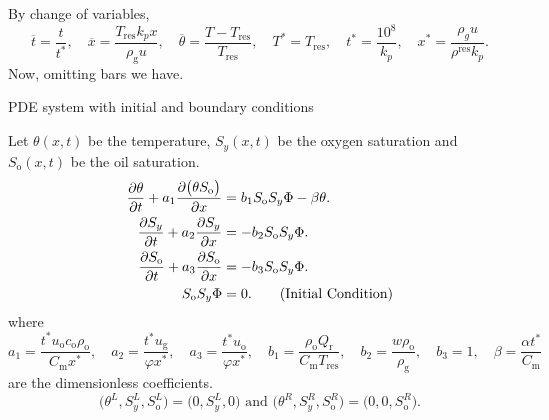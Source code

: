 \documentclass[
    8pt,
    aspectratio=1610,
    c,
    intlimits,
    leqno,
    professionalfonts,
]{beamer}
\begin{document}
\begin{frame}
	\frametitle{\secname}
	By change of variables,
	\begin{equation}
		\overline{t}=
		\frac{t}{t^{\ast}},\quad
		\overline{x}=
		\frac{T_{\text{res}}k_{p}x}{\rho_{\text{g}}u},\quad
		\overline{\theta}=
		\frac{T-T_{\text{res}}}{T_{\text{res}}},\quad
		T^{\ast}=T_{\text{res}},\quad
		t^{\ast}=
		\frac{10^{8}}{k_{p}},\quad
		x^{\ast}=
		\frac{\rho_{g}u}{\rho^{\text{res}}k_{p}}.
	\end{equation}
	Now, omitting bars we have.

	\begin{block}{PDE system with initial and boundary
			conditions~\cite{Quispe2020}}

		Let $\theta\left(x,t\right)$ be the \alert{temperature},
		$S_{y}\left(x,t\right)$ be the \alert{oxygen saturation} and
		$S_{\text{o}}\left(x,t\right)$ be the \alert{oil saturation}.
		\begin{align}
			\diffp{\theta}{t}+
			a_{1}
			\diffp{
				\big(
				\theta
				S_{\text{o}}
				\big)
			}{x}                    & =
			b_{1}
			S_{\text{o}}
			S_{y}
			\Phi-
			\beta\theta.
			\label{eq:6}                \\
			\diffp{S_{y}}{t}+
			a_{2}
			\diffp{S_{y}}{x}        & =
			-b_{2}
			S_{\text{o}}
			S_{y}
			\Phi.
			\label{eq:7}                \\
			\diffp{S_{\text{o}}}{t}+
			a_{3}
			\diffp{S_{\text{o}}}{x} & =
			-b_{3}
			S_{\text{o}}
			S_{y}
			\Phi.
			\label{eq:8}                \\
			S_{\text{o}}
			S_{y}
			\Phi                    & =
			0.
			\tag{Initial Condition}
		\end{align}
		where
		\begin{equation}
			a_{1}=
			\frac{
			t^{\ast}
			u_{\text{o}}
			c_{\text{o}}
			\rho_{\text{o}}
			}{C_{\text{m}}x^{\ast}},\quad
			a_{2}=
			\frac{t^{\ast}u_{\text{g}}}{\varphi x^{\ast}},\quad
			a_{3}=
			\frac{t^{\ast}u_{\text{o}}}{\varphi x^{\ast}},\quad
			b_{1}=
			\frac{
				\rho_{\text{o}}
				Q_{\text{r}}
			}{
				C_{\text{m}}
				T_{\text{res}}
			},\quad
			b_{2}=
			\frac{w\rho_{\text{o}}}{\rho_{\text{g}}},\quad
			b_{3}=
			1,\quad
			\beta=
			\frac{\alpha t^{\ast}}{C_{\text{m}}}
		\end{equation}
		are the dimensionless coefficients.
		\setcounter{equation}{12}
		\begin{equation}
			\big(
			\theta^{L},
			S^{L}_{y},
			S^{L}_{\text{o}}
			\big)=
			\big(
			0,
			S^{L}_{y},
			0
			\big)
			\text{ and }
			\big(
			\theta^{R},
			S^{R}_{y},
			S^{R}_{\text{o}}
			\big)                           =
			\big(
			0,
			0,
			S^{R}_{\text{o}}
			\big).
			\label{eq:13}
		\end{equation}
	\end{block}
\end{frame}
\end{document}
